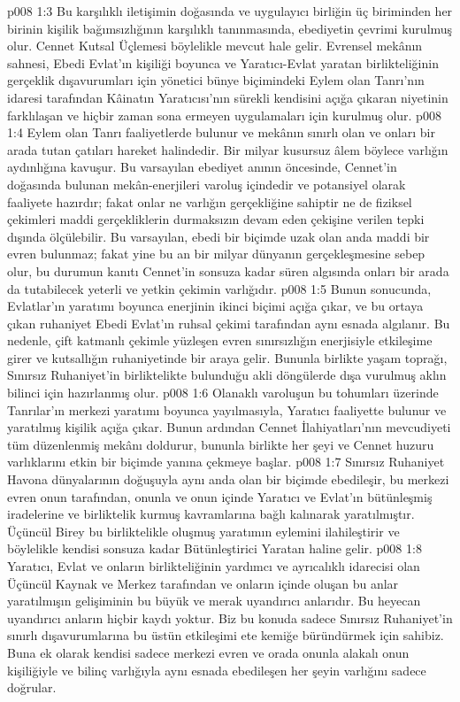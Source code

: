 \vs p008 1:3 Bu karşılıklı iletişimin doğasında ve uygulayıcı birliğin üç biriminden her birinin kişilik bağımsızlığının karşılıklı tanınmasında, ebediyetin çevrimi kurulmuş olur. Cennet Kutsal Üçlemesi böylelikle mevcut hale gelir. Evrensel mekânın sahnesi, Ebedi Evlat’ın kişiliği boyunca ve Yaratıcı\hyp{}Evlat yaratan birlikteliğinin gerçeklik dışavurumları için yönetici bünye biçimindeki Eylem olan Tanrı’nın idaresi tarafından Kâinatın Yaratıcısı’nın sürekli kendisini açığa çıkaran niyetinin farklılaşan ve hiçbir zaman sona ermeyen uygulamaları için kurulmuş olur.
\vs p008 1:4 Eylem olan Tanrı faaliyetlerde bulunur ve mekânın sınırlı olan ve onları bir arada tutan çatıları hareket halindedir. Bir milyar kusursuz âlem böylece varlığın aydınlığına kavuşur. Bu varsayılan ebediyet anının öncesinde, Cennet’in doğasında bulunan mekân\hyp{}enerjileri varoluş içindedir ve potansiyel olarak faaliyete hazırdır; fakat onlar ne varlığın gerçekliğine sahiptir ne de fiziksel çekimleri maddi gerçekliklerin durmaksızın devam eden çekişine verilen tepki dışında ölçülebilir. Bu varsayılan, ebedi bir biçimde uzak olan anda maddi bir evren bulunmaz; fakat yine bu an bir milyar dünyanın gerçekleşmesine sebep olur, bu durumun kanıtı Cennet’in sonsuza kadar süren algısında onları bir arada da tutabilecek yeterli ve yetkin çekimin varlığıdır.
\vs p008 1:5 Bunun sonucunda, Evlatlar’ın yaratımı boyunca enerjinin ikinci biçimi açığa çıkar, ve bu ortaya çıkan ruhaniyet Ebedi Evlat’ın ruhsal çekimi tarafından aynı esnada algılanır. Bu nedenle, çift katmanlı çekimle yüzleşen evren sınırsızlığın enerjisiyle etkileşime girer ve kutsallığın ruhaniyetinde bir araya gelir. Bununla birlikte yaşam toprağı, Sınırsız Ruhaniyet’in birliktelikte bulunduğu akli döngülerde dışa vurulmuş aklın bilinci için hazırlanmış olur.
\vs p008 1:6 Olanaklı varoluşun bu tohumları üzerinde Tanrılar’ın merkezi yaratımı boyunca yayılmasıyla, Yaratıcı faaliyette bulunur ve yaratılmış kişilik açığa çıkar. Bunun ardından Cennet İlahiyatları’nın mevcudiyeti tüm düzenlenmiş mekânı doldurur, bununla birlikte her şeyi ve Cennet huzuru varlıklarını etkin bir biçimde yanına çekmeye başlar.
\vs p008 1:7 Sınırsız Ruhaniyet Havona dünyalarının doğuşuyla aynı anda olan bir biçimde ebedileşir, bu merkezi evren onun tarafından, onunla ve onun içinde Yaratıcı ve Evlat’ın bütünleşmiş iradelerine ve birliktelik kurmuş kavramlarına bağlı kalınarak yaratılmıştır. Üçüncül Birey bu birliktelikle oluşmuş yaratımın eylemini ilahileştirir ve böylelikle kendisi sonsuza kadar Bütünleştirici Yaratan haline gelir.
\vs p008 1:8 Yaratıcı, Evlat ve onların birlikteliğinin yardımcı ve ayrıcalıklı idarecisi olan Üçüncül Kaynak ve Merkez tarafından ve onların içinde oluşan bu anlar yaratılmışın gelişiminin bu büyük ve merak uyandırıcı anlarıdır. Bu heyecan uyandırıcı anların hiçbir kaydı yoktur. Biz bu konuda sadece Sınırsız Ruhaniyet’in sınırlı dışavurumlarına bu üstün etkileşimi ete kemiğe büründürmek için sahibiz. Buna ek olarak kendisi sadece merkezi evren ve orada onunla alakalı onun kişiliğiyle ve bilinç varlığıyla aynı esnada ebedileşen her şeyin varlığını sadece doğrular.
